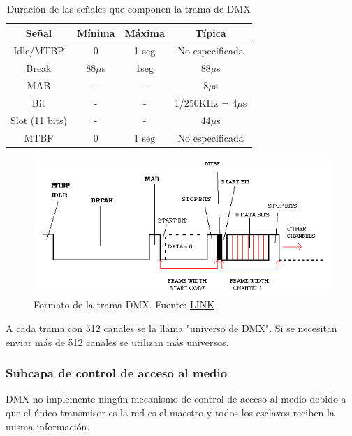 \begin{table}[!ht]
	\begin{center}
		\begin{tabular}{|c|c|c|c|}
			\hline
			\textbf{Señal} & \textbf{Mínima} & \textbf{Máxima} & \textbf{Típica} \\
			\hline \hline
			Idle/MTBP & 0 & 1 seg & No especificada \\
			Break & 88\(\mu \)s & 1seg & 88\(\mu \)s\\
			MAB & - & - & 8\(\mu \)s \\
			Bit & - & - & 1/250KHz = 4\(\mu \)s \\
			Slot (11 bits) & - & - & 44\(\mu \)s \\
			MTBF & 0 & 1 seg & No especificada \\
			\hline
		\end{tabular}
	\end{center}
	\caption{Duración de las señales que componen la trama de DMX}
	\label{table:\thetable}
\end{table}

\begin{figure}[!ht]
	\centering
	\includegraphics[width=15cm,scale=1]{resources/1_8-tramaDMX.png}
	\caption{Formato de la trama DMX. Fuente: \href{http://www.dmx512-online.com/packt.html}{LINK}}
	\label{fig:\thefigure}
\end{figure}

A cada trama con 512 canales se la llama "universo de DMX". Si se necesitan enviar más de 512 canales se utilizan más universos.

\subsubsection{Subcapa de control de acceso al medio}
DMX no implemente ningún mecanismo de control de acceso al medio debido a que el único transmisor es la red es el maestro y todos los esclavos reciben la misma información.

